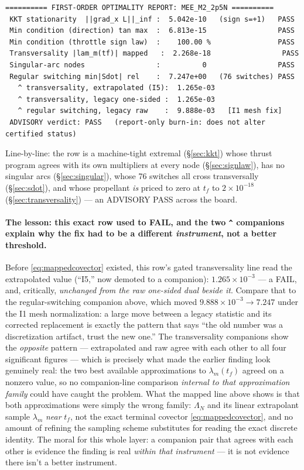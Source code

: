 \documentclass[11pt]{article}
\begin{document}
\begin{small}
\begin{verbatim}
========== FIRST-ORDER OPTIMALITY REPORT: MEE_M2_2p5N ==========
 KKT stationarity  ||grad_x L||_inf :  5.042e-10   (sign s=+1)   PASS
 Min condition (direction) tan max  :  6.813e-15                 PASS
 Min condition (throttle sign law)  :    100.00 %                PASS
 Transversality |lam_m(tf)| mapped   :  2.268e-18                 PASS
 Singular-arc nodes                 :          0                 PASS
 Regular switching min|Sdot| rel    :  7.247e+00   (76 switches) PASS
   ^ transversality, extrapolated (I5):  1.265e-03
   ^ transversality, legacy one-sided :  1.265e-03
   ^ regular switching, legacy raw    :  9.888e-03   [I1 mesh fix]
 ADVISORY verdict: PASS   (report-only burn-in: does not alter certified status)
\end{verbatim}
\end{small}

\noindent
Line-by-line: the row is a machine-tight extremal (\S\ref{sec:kkt}) whose
thrust program agrees with its own multipliers at every node
(\S\ref{sec:signlaw}), has no singular arcs (\S\ref{sec:singular}), whose
76 switches all cross transversally (\S\ref{sec:sdot}), and whose propellant
\emph{is} priced to zero at $t_f$ to $2\times10^{-18}$
(\S\ref{sec:transversality}) --- an ADVISORY PASS across the board.

\paragraph{The lesson: this exact row used to FAIL, and the two
\texttt{\^{}} companions explain why the fix had to be a different
\emph{instrument}, not a better threshold.} Before \eqref{eq:mappedcovector}
existed, this row's gated transversality line read the extrapolated value
(``I5,'' now demoted to a companion): $1.265\times10^{-3}$ --- a FAIL, and,
critically, \emph{unchanged from the raw one-sided dual beside it}. Compare
that to the regular-switching companion above, which moved
$9.888\times10^{-3}\to7.247$ under the I1 mesh normalization: a large move
between a legacy statistic and its corrected replacement is exactly the
pattern that says ``the old number was a discretization artifact, trust the
new one.'' The transversality companions show the \emph{opposite} pattern ---
extrapolated and raw agree with each other to all four significant figures ---
which is precisely what made the earlier finding look genuinely real: the two
best available approximations to $\lambda_m(t_f)$ agreed on a nonzero value,
so no companion-line comparison \emph{internal to that approximation family}
could have caught the problem. What the mapped line above shows is that both
approximations were simply the wrong family: $\Lambda_N$ and its linear
extrapolant sample $\lambda_m$ \emph{near} $t_f$, not the exact terminal
covector \eqref{eq:mappedcovector}, and no amount of refining the sampling
scheme substitutes for reading the exact discrete identity. The moral for
this whole layer: a companion pair that agrees with each other is evidence
the finding is real \emph{within that instrument} --- it is not evidence
there isn't a better instrument.
\end{document}
